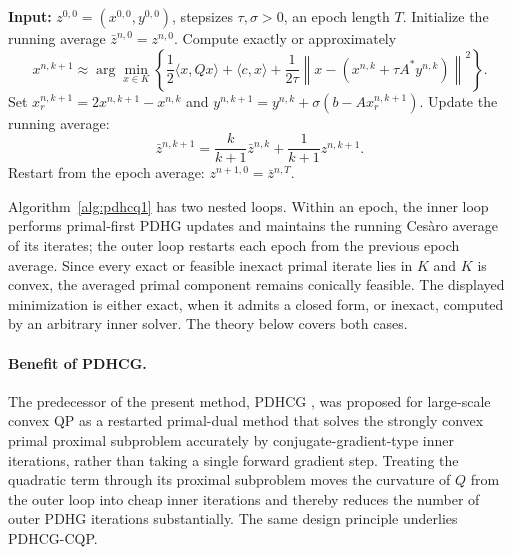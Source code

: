 \documentclass[letterpaper]{article} %
\newcommand{\name}{PDHCG-CQP\xspace}
\theoremstyle{definition}
\theoremstyle{remark}
\begin{document}
\begin{algorithm}[H]
\caption{\name: restarted averaged PDHG for the original conic QP}
\label{alg:pdhcq1}
\begin{algorithmic}[1]
\State \textbf{Input:} $z^{0,0}=(x^{0,0},y^{0,0})$, stepsizes $\tau,\sigma>0$, an epoch length $T$.
    \State Initialize the running average $\bar z^{n,0}=z^{n,0}$.
        \State Compute exactly or approximately
        \[
            x^{n,k+1}
            \approx
            \arg\min_{x\in K}
            \left\{
                \frac12\langle x,Qx\rangle+\langle c,x\rangle
                +\frac{1}{2\tau} \left\|x-\left( x^{n,k}+\tau A^*y^{n,k}\right) \right\|^2
            \right\}.
        \]
        \State Set
        $x_r^{n,k+1}=2x^{n,k+1}-x^{n,k}$ and
        $y^{n,k+1}=y^{n,k}+\sigma(b-Ax_r^{n,k+1})$.
        \State Update the running average:
        \[
            \bar z^{n,k+1}
            =
            \frac{k}{k+1}\bar z^{n,k}
            +
            \frac{1}{k+1}z^{n,k+1}.
        \]
    \EndFor
    \State Restart from the epoch average:
    $z^{n+1,0}=\bar z^{n,T}$.
\EndFor
\end{algorithmic}
\end{algorithm}

Algorithm~\ref{alg:pdhcq1} has two nested loops. Within an epoch, the inner
loop performs primal-first PDHG updates and maintains the running Ces\`aro
average of its iterates; the outer loop restarts each epoch from the previous
epoch average. Since every exact or feasible inexact primal iterate lies in
$K$ and $K$ is convex, the averaged primal component remains conically
feasible. The displayed minimization is either exact, when it admits a closed
form, or inexact, computed by an arbitrary inner solver. The theory below
covers both cases.

\paragraph{Benefit of PDHCG.}
The predecessor of the present method, PDHCG \cite{huang2025restarted}, was proposed for large-scale
convex QP as a restarted primal-dual method that solves the strongly convex
primal proximal subproblem accurately by conjugate-gradient-type inner
iterations, rather than taking a single forward gradient step.  Treating the quadratic term through its
proximal subproblem moves the curvature of $Q$ from the outer loop into
cheap inner iterations and thereby reduces the number of outer PDHG
iterations substantially.  The same design principle underlies \name.
\end{document}
